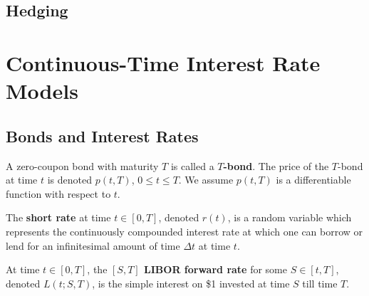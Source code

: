 \documentclass[11pt,fleqn]{book} %
\begin{document}

\section{Hedging}



\chapter{Continuous-Time Interest Rate Models}


\section{Bonds and Interest Rates}
\begin{definition} \label{def:511}
A zero-coupon bond with maturity \(T\) is called a \textbf{\(T\)-bond}. The price of the \(T\)-bond at time \(t\) is denoted \(p(t, T)\), \(0 \leq t \leq T\). We assume \(p(t, T)\) is a differentiable function with respect to \(t\).
\end{definition}

\begin{definition} \label{def:512}
The \textbf{short rate} at time \(t \in [0, T]\), denoted \(r(t)\), is a random variable which represents the continuously compounded interest rate at which one can borrow or lend for an infinitesimal amount of time \(\Delta t\) at time \(t\).
\end{definition}

\begin{definition} \label{def:513}
At time \(t \in [0, T]\), the \textbf{\([S, T]\) LIBOR forward rate} for some \(S \in [t, T]\), denoted \(L(t; S, T)\), is the simple interest on \$1 invested at time \(S\) till time \(T\).
\end{definition}
\end{document}
